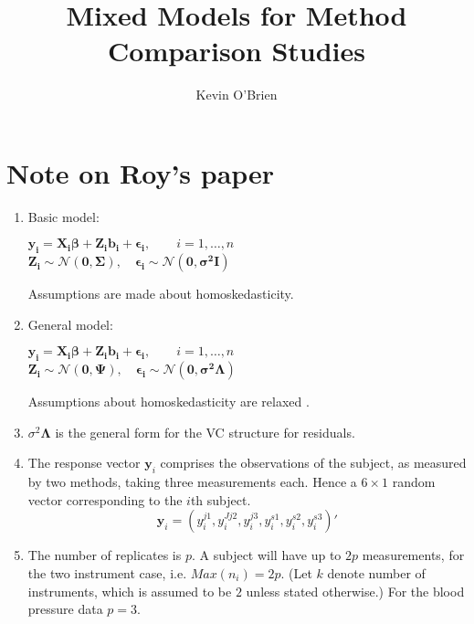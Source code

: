 \documentclass[12pt, a4paper]{article}
\begin{document}
\author{Kevin O'Brien}
\title{Mixed Models for Method Comparison Studies}
\tableofcontents
\section{Note on Roy's paper}
\begin{enumerate}


\item Basic model:
\begin{center}
$ \boldsymbol{y_{i}} = \boldsymbol{X_{i}\beta}
+ \boldsymbol{Z_{i}b_{i}} + \boldsymbol{\epsilon_{i}}, \qquad i=1,\dots,n$ \\
$\boldsymbol{Z_{i}} \sim \mathcal{N}(\boldsymbol{0,\Sigma}),\quad
\boldsymbol{\epsilon_{i}} \sim \mathcal{N}(\boldsymbol{0, \sigma^2
\boldsymbol{I} })$
\end{center}

Assumptions are made about homoskedasticity.

\item General model:
\begin{center}
$ \boldsymbol{y_{i}} = \boldsymbol{X_{i}\beta}
+ \boldsymbol{Z_{i}b_{i}} + \boldsymbol{\epsilon_{i}}, \qquad i=1,\dots,n$ \\
$\boldsymbol{Z_{i}} \sim \mathcal{N}(\boldsymbol{0,\Psi}),\quad
\boldsymbol{\epsilon_{i}} \sim \mathcal{N}(\boldsymbol{0,\sigma^2 \boldsymbol{\Lambda} })$
\end{center}

Assumptions about homoskedasticity are relaxed \cite[pg.202]{pb}.





\item $\sigma^2 \boldsymbol{\Lambda}$ is the general form for the VC structure for residuals.

\item The response vector $\boldsymbol{y}_{i}$ comprises the observations of
the subject, as measured by two methods, taking three measurements each.
Hence a $6 \times 1$ random vector corresponding to the $i$th subject.
\begin{equation}
\boldsymbol{y}_{i} = (y_{i}^{j1},y_{i}^{Jj2},y_{i}^{j3},y_{i}^{s1},y_{i}^{s2},y_{i}^{s3}) \prime
\end{equation}

\item The number of replicates is $p$. A subject will have up to
 $2p$ measurements, for the two instrument case, i.e. $Max(n_{i}) = 2p$.
(Let $k$ denote number of instruments, which is assumed to be $2$
unless stated otherwise.) For the blood pressure data $p=3$.


\end{enumerate}
\end{document}
